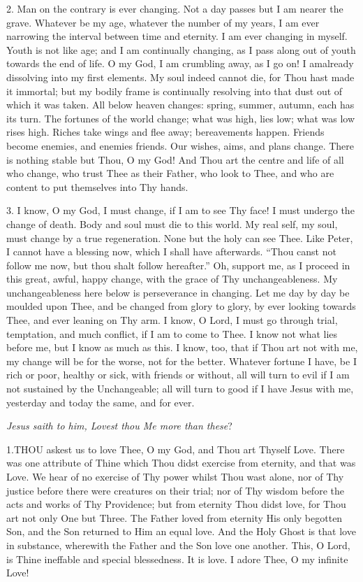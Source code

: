 2. Man on the contrary is ever
changing. Not a day passes but I am nearer the grave. Whatever be my age, whatever the number of my years, I am ever narrowing the
interval between time and eternity. I am ever changing in myself. Youth
is not like age; and I am continually changing, as I pass along out of
youth towards the end of life. O my God, I am crumbling away, as I go
on! I am\emph{}already dissolving into my first elements. My soul
indeed cannot die, for Thou hast made it immortal; but my bodily frame
is continually resolving into that dust out of which it was taken. All
below heaven changes: spring, summer, autumn, each has its turn. The
fortunes of the world change; what was high, lies low; what was low
rises high. Riches take wings and flee away; bereavements happen.
Friends become enemies, and enemies friends. Our wishes, aims, and plans
change. There is nothing stable but Thou, O my God! And Thou art the
centre and life of all who change, who trust Thee as their Father, who
look to Thee, and who are content to put themselves into Thy hands.

3. I know, O my God, I must
change, if I am to see Thy face! I must undergo the change of death.
Body and soul must die to this world. My real self, my soul, must change
by a true regeneration. None but the holy can see Thee. Like Peter, I
cannot have a blessing now, which I shall have afterwards. ``Thou canst
not follow me now, but thou shalt follow hereafter.'' Oh, support me, as
I proceed in this great, awful, happy change, with the grace of Thy
unchangeableness. My unchangeableness here below is perseverance in
changing. Let me day by day be moulded upon Thee, and be changed from
glory to glory, by ever looking towards Thee, and ever leaning on
Thy arm. I know, O Lord, I must go through trial, temptation, and much
conflict, if I am to come to Thee. I know not what lies before me, but I
know as much as this. I know, too, that if Thou art not with me, my
change will be for the worse, not for the better. Whatever fortune I
have, be I rich or poor, healthy or sick, with friends or without, all
will turn to evil if I am not sustained by the Unchangeable; all will
turn to good if I have Jesus with me, yesterday and today the same, and
for ever.


\emph{Jesus
saith to him, Lovest thou Me more than these}?

1.\emph{}THOU
askest us to love Thee, O my God, and Thou art Thyself Love. There was
one attribute of Thine which Thou didst exercise from eternity, and that
was Love. We hear of no exercise of Thy power whilst Thou wast alone,
nor of Thy justice before there were creatures on their trial; nor of
Thy wisdom before the acts and works of Thy Providence; but from
eternity Thou didst love, for Thou art not only One but Three. The
Father loved from eternity His only begotten Son, and the Son returned
to Him an equal love. And the Holy Ghost is that love in substance,
wherewith the Father and the Son love one another. This, O Lord, is
Thine ineffable and special blessedness. It is love. I adore Thee, O my
infinite Love!

